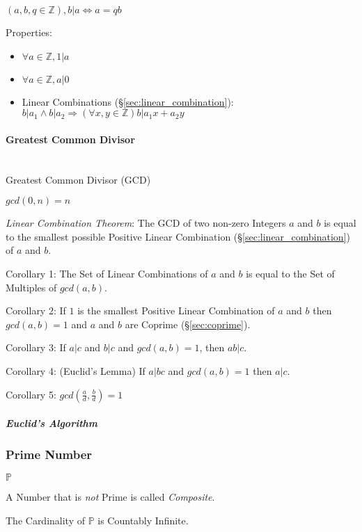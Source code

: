 $(a,b,q \in \mathbb{Z}), b|a \Leftrightarrow a = qb$

Properties:

\begin{itemize}
\item $\forall a \in \mathbb{Z}, 1|a$
\item $\forall a \in \mathbb{Z}, a|0$
\item Linear Combinations (\S\ref{sec:linear_combination}): $b|a_1
  \wedge b|a_2 \Rightarrow (\forall x,y \in \mathbb{Z})b|a_1 x + a_2
  y$
\end{itemize}



\paragraph{Greatest Common Divisor}\label{sec:gcd}
\hfill \\

Greatest Common Divisor (GCD)

$gcd(0,n) = n$

\emph{Linear Combination Theorem}: The GCD of two non-zero Integers
$a$ and $b$ is equal to the smallest possible Positive Linear
Combination (\S\ref{sec:linear_combination}) of $a$ and $b$.

Corollary 1: The Set of Linear Combinations of $a$ and $b$ is equal to
the Set of Multiples of $gcd(a,b)$.

Corollary 2: If $1$ is the smallest Positive Linear Combination of $a$
and $b$ then $gcd(a,b) = 1$ and $a$ and $b$ are Coprime
(\S\ref{sec:coprime}).

Corollary 3: If $a|c$ and $b|c$ and $gcd(a,b) = 1$, then $ab|c$.

Corollary 4: (Euclid's Lemma) If $a | bc$ and $gcd(a,b) = 1$ then
$a|c$.

Corollary 5: $gcd(\frac{a}{d}, \frac{b}{d}) = 1$



\subparagraph{Euclid's Algorithm}\label{sec:euclids_algorithm}



\subsubsection{Prime Number}\label{sec:prime_number}

$\mathbb{P}$

A Number that is \emph{not} Prime is called \emph{Composite}.

The Cardinality of $\mathbb{P}$ is Countably Infinite.

